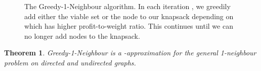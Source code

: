 \documentclass[12pt]{article}
\newtheorem{theorem}{Theorem}
\begin{document}
\begin{figure}[tb]
\begin{center}
\end{center}
\caption{\label{alg:greedy-1-neighbour} The {\sc Greedy-1-Neighbour} algorithm.  In each iteration , we greedily add either the viable set  or the node  to our knapsack  depending on which has higher profit-to-weight ratio.  This continues until we can no longer add nodes to the knapsack.}
\vspace{-4mm}
\end{figure}







\begin{theorem} \label{thm:gd1n}
{\sc Greedy-1-Neighbour} is a
-approximation for the
general 1-neighbour problem on directed and undirected graphs.
\end{theorem}
\end{document}
